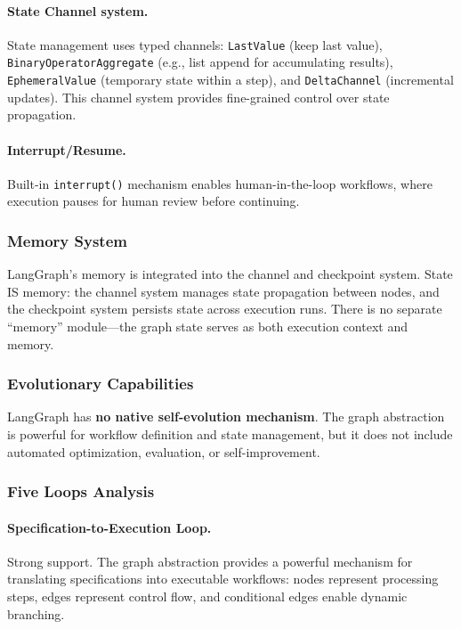 \paragraph{State Channel system.}
State management uses typed channels: \texttt{LastValue} (keep last value), \texttt{BinaryOperatorAggregate} (e.g., list append for accumulating results), \texttt{EphemeralValue} (temporary state within a step), and \texttt{DeltaChannel} (incremental updates). This channel system provides fine-grained control over state propagation.

\paragraph{Interrupt/Resume.}
Built-in \texttt{interrupt()} mechanism enables human-in-the-loop workflows, where execution pauses for human review before continuing.

\subsubsection{Memory System}

LangGraph's memory is integrated into the channel and checkpoint system. State IS memory: the channel system manages state propagation between nodes, and the checkpoint system persists state across execution runs. There is no separate ``memory'' module---the graph state serves as both execution context and memory.

\subsubsection{Evolutionary Capabilities}

LangGraph has \textbf{no native self-evolution mechanism}. The graph abstraction is powerful for workflow definition and state management, but it does not include automated optimization, evaluation, or self-improvement.

\subsubsection{Five Loops Analysis}

\paragraph{Specification-to-Execution Loop.}
Strong support. The graph abstraction provides a powerful mechanism for translating specifications into executable workflows: nodes represent processing steps, edges represent control flow, and conditional edges enable dynamic branching.

